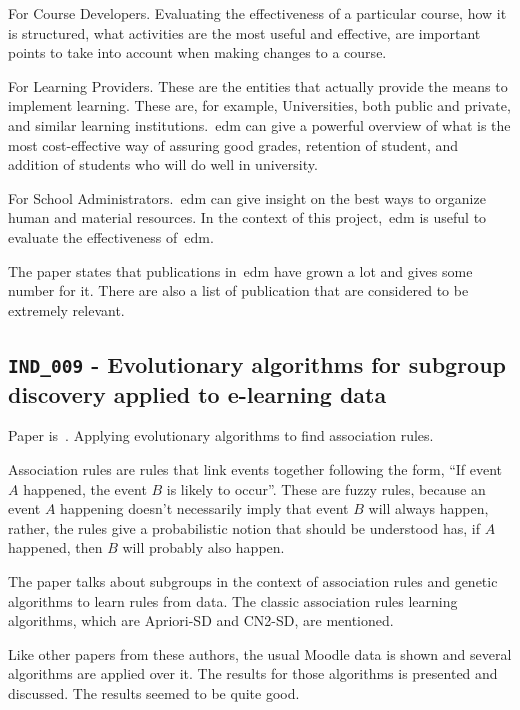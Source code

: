 For Course Developers. Evaluating the effectiveness of a particular course, how
it is structured, what activities are the most useful and effective, are
important points to take into account when making changes to a course.

For Learning Providers. These are the entities that actually provide the means
to implement learning. These are, for example, Universities, both public and
private, and similar learning institutions.~\gls{edm} can give a powerful
overview of what is the most cost-effective way of assuring good grades,
retention of student, and addition of students who will do well in university.

For School Administrators.~\gls{edm} can give insight on the best ways to
organize human and material resources. In the context of this
project,~\gls{edm} is useful to evaluate the effectiveness of~\gls{edm}.

The paper states that publications in~\gls{edm} have grown a lot and gives some
number for it. There are also a list of publication that are considered to be
extremely relevant.

\subsection{\texttt{IND\_009} - Evolutionary algorithms for subgroup discovery
applied to e-learning data}

Paper is~\cite{ind_009}. Applying evolutionary algorithms to find association
rules.

Association rules are rules that link events together following the form, ``If
event $ A $ happened, the event $ B $ is likely to occur''. These are fuzzy
rules, because an event $ A $ happening doesn't necessarily imply that event $
B $ will always happen, rather, the rules give a probabilistic notion that
should be understood has, if $ A $ happened, then $ B $ will probably also
happen.

The paper talks about subgroups in the context of association rules and genetic
algorithms to learn rules from data. The classic association rules learning
algorithms, which are Apriori-SD and CN2-SD, are mentioned.

Like other papers from these authors, the usual Moodle data is shown and
several algorithms are applied over it. The results for those algorithms is
presented and discussed. The results seemed to be quite good.

